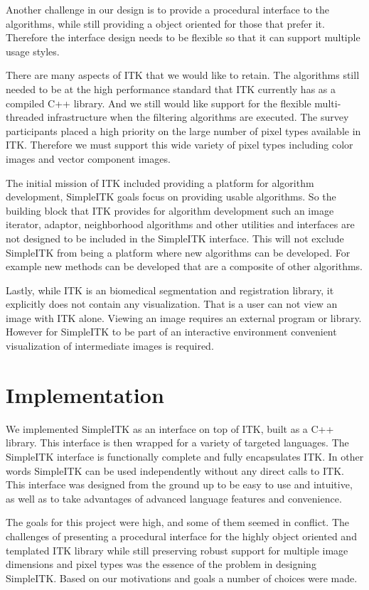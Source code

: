 \documentclass{frontiersMED} %
\begin{document}
Another challenge in our design is to provide a procedural interface
to the algorithms, while still providing a object oriented for those
that prefer it. Therefore the interface design needs to be flexible so
that it can support multiple usage styles.

There are many aspects of ITK that we would like to retain. The
algorithms still needed to be at the high performance standard that
ITK currently has as a compiled C++ library. And we still would like
support for the flexible multi-threaded infrastructure when the
filtering algorithms are executed. The survey participants placed a
high priority on the large number of pixel types available in
ITK. Therefore we must support this wide variety of pixel types
including color images and vector component images.

The initial mission of ITK included providing a platform for algorithm
development, SimpleITK goals focus on providing usable algorithms. So
the building block that ITK provides for algorithm development such an
image iterator, adaptor, neighborhood algorithms and other utilities
and interfaces are not designed to be included in the SimpleITK
interface. This will not exclude SimpleITK from being a platform where
new algorithms can be developed. For example new methods can be
developed that are a composite of other algorithms.

Lastly, while ITK is an biomedical segmentation and registration
library, it explicitly does not contain any visualization. That is a
user can not view an image with ITK alone. Viewing an image requires
an external program or library. However for SimpleITK to be part of an
interactive environment convenient visualization of intermediate
images is required.

\section{Implementation}

We implemented SimpleITK as an interface on top of ITK, built as a C++
library. This interface is then wrapped for a variety of targeted
languages. The SimpleITK interface is functionally complete and fully
encapsulates ITK.  In other words SimpleITK can be used independently
without any direct calls to ITK. This interface was designed from the
ground up to be easy to use and intuitive, as well as to take
advantages of advanced language features and convenience.

The goals for this project were high, and some of them seemed in
conflict. The challenges of presenting a procedural interface for the
highly object oriented and templated ITK library while still
preserving robust support for multiple image dimensions and pixel
types was the essence of the problem in designing SimpleITK. Based on
our motivations and goals a number of choices were made.
\end{document}
